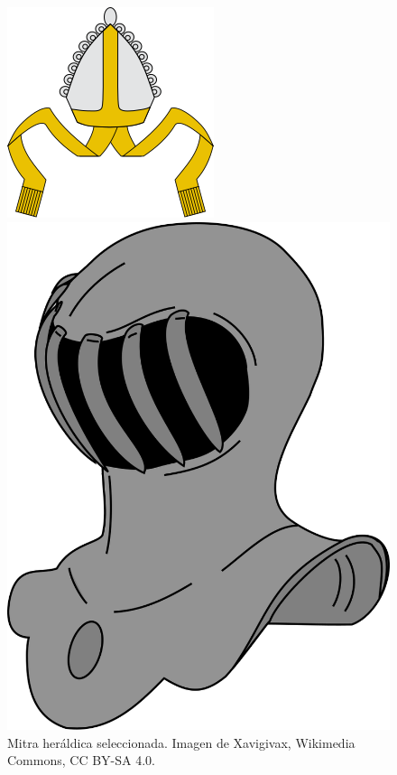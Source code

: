 \begin{itemize}
\begin{figure}[h!]
\begin{minipage}{0.3\textwidth}
        \includegraphics[width=\textwidth]{figuras/mitra.png}
        \caption{Mitra heráldica seleccionada. Imagen de Xavigivax, Wikimedia Commons, CC BY-SA 4.0.}
    \end{minipage}
    \hfill
    \begin{minipage}{0.3\textwidth}
        \centering
        \includegraphics[width=\textwidth]{figuras/yelmo.png}

\end{minipage}
\end{figure}
\end{itemize}
